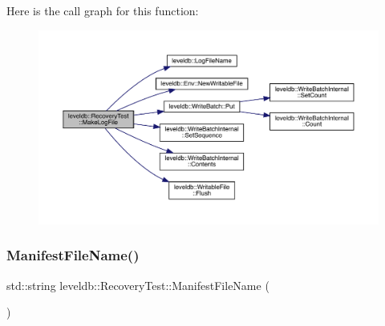 Here is the call graph for this function\+:
\nopagebreak
\begin{figure}[H]
\begin{center}
\leavevmode
\includegraphics[width=350pt]{classleveldb_1_1_recovery_test_a361c575ee0f6531b95fb58878b1c69bf_cgraph}
\end{center}
\end{figure}
\mbox{\label{classleveldb_1_1_recovery_test_a544166c64a5b786612230973ce510eaa}} 
\subsubsection{\texorpdfstring{ManifestFileName()}{ManifestFileName()}}
{\footnotesize\ttfamily std\+::string leveldb\+::\+Recovery\+Test\+::\+Manifest\+File\+Name (\begin{DoxyParamCaption}{ }\end{DoxyParamCaption})\hspace{0.3cm}{\ttfamily [inline]}}

